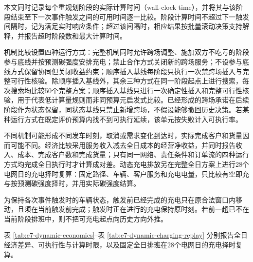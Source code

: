 \documentclass{setp-new}
\newcommand{\setptabsetup}{\fontsize{9pt}{10.5pt}\selectfont\renewcommand{\arraystretch}{0.90}\setlength{\tabcolsep}{2.2pt}\setlength{\aboverulesep}{0.4pt}\setlength{\belowrulesep}{0.4pt}\hbadness=10000}
\newif\ifESevenReady
\begin{document}
本文同时记录每个重规划阶段的实际计算时间（wall-clock time），并将其与该阶段结束至下一次事件触发之间的可用时间逐一比较。阶段计算时间不超过下一触发间隔时，记为满足实时响应条件；超过该间隔时，相应结果按批量滚动决策支持解释，并报告超时阶段数和最大计算时间。

机制比较设置四种运行方式：完整机制同时允许跨场调整、施加双方不吃亏的阶段参与底线并按预测碳强度安排充电；禁止合作方式关闭新的跨场服务；不设参与底线方式保留协同但关闭收益约束；顺序插入基线每阶段只执行一次禁跨场插入与完整可行性核验。除顺序插入基线外，其余三种方式在同一阶段起点上进行搜索，每次搜索均比较50个完整方案；顺序插入基线只进行一次确定性插入和完整可行性核验，用于代表低计算量规则而非同预算元启发式比较。已经形成的跨场承诺在后续阶段作为状态保留，同状态基线只禁止新增跨场，不假设能够撤回历史决策。若某种运行方式在既定评价预算内找不到可执行延续，该单元按失败计入可执行率。

不同机制可能形成不同发车时刻，取消或需求变化到达时，实际完成客户和货量因而可能不同。经济比较采用服务收入减去全日成本的经营净收益，并同时报告收入、成本、完成客户数和完成货量；只有同一网络、责任条件和订单流的四种运行方式均完成全日执行时才计算成对差。动态充电排放另在完整全日方案上进行28个电网日的充电择时复算：固定路径、车辆、客户服务和充电电量，只比较有空即充与按预测碳强度择时，并用实际碳强度结算。

为保持各次事件触发时的车辆状态，触发前已经完成的充电只在原合法窗口内移动，且须在当前触发前完成；触发时正在进行的充电保持原时刻。若前一趟已不在当前阶段排班中，则不把可充电起点向历史方向外推。

\ifESevenReady
表 \ref{tab:e7-dynamic-economics}--表 \ref{tab:e7-dynamic-charging-replay} 分别报告全日经济差异、可执行性与计算时限，以及固定全日排班在28个电网日的充电择时复算。


\begin{table}[H]
\centering
\caption{完整动态机制相对三类对照的全日经济结果分解}
\label{tab:e7-dynamic-economics}
\setptabsetup

\end{table}

\begin{table}[H]
\centering
\caption{动态机制的可执行性、跨场服务和计算时限诊断}
\label{tab:e7-dynamic-diagnostics}
\setptabsetup

\end{table}
\end{document}

